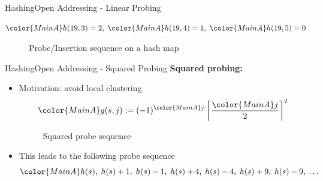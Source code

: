 \begin{frame}{Hashing}{Open Addressing - Linear Probing}
\begin{itemize}
\begin{math}
        {\color{MainA}h(19, 3)} = 2 ,\;
        {\color{MainA}h(19, 4)} = 1 ,\;
        {\color{MainA}h(19, 5)} = 0
      \end{math}
      \begin{figure}[!h]
        \def\LPEData{
          {19, {\color{green2}F}}/0,
          {15, {\color{green2}D}}/1,
          {2, {\color{green2}E}}/2,
          {5, {\color{green2}C}}/3,
          {53, {\color{green2}B}}/4,
          {12, {\color{green2}A}}/5,
          \relax/6
        }%
        \def\LPEShowIndex{0}%
        \begin{adjustbox}{width=0.75\linewidth}%
        \end{adjustbox}
        \vspace{-0.5em}%
        \caption{Probe/Insertion sequence on a hash map}%
        \label{fig:hashing:open_addressing:linear_probing_example7}%
      \end{figure}
  \end{itemize}
\end{frame}


\begin{frame}{Hashing}{Open Addressing - Squared Probing}
  \textbf{Squared probing:}
  \begin{itemize}
    \item<2->
      Motivation: avoid local clustering
      \begin{displaymath}
        {\color{MainA}g(s,j)}
        := (-1)^{\color{MainA}j}
        \left\lceil \frac{{\color{MainA}j}}{2} \right\rceil^2
      \end{displaymath}
    \vspace{-2.0em}
  \begin{figure}[!h]
    \begin{adjustbox}{width=0.7\linewidth}%
    \end{adjustbox}
    \vspace{-1.0em}
    \caption{Squared probe sequence}%
    \label{fig:hashing:open_addressing:squared_probing}%
  \end{figure}
    \item<4->
      This leads to the following probe sequence
      \begin{displaymath}
        {\color{MainA}h(s) ,\;
        h(s)+1 ,\;
        h(s)-1 ,\;
        h(s)+4 ,\;
        h(s)-4 ,\;
        h(s)+9 ,\;
        h(s)-9 ,\;}
        \dotsc
      \end{displaymath}
  \end{itemize}
  \vspace{1.0em}
\end{frame}

